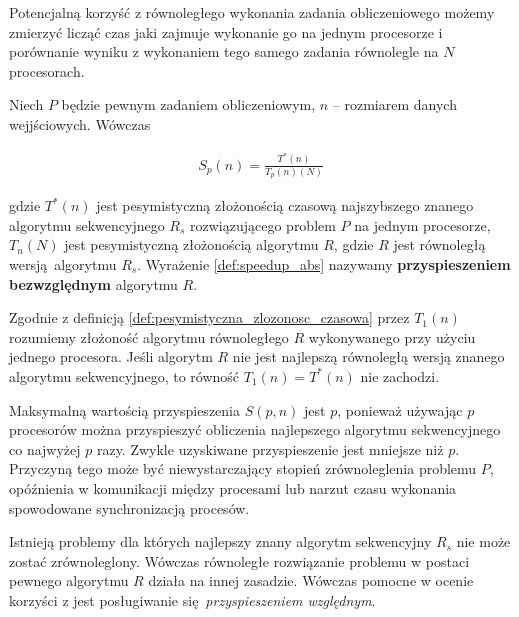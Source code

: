 Potencjalną korzyść z równoległego wykonania zadania obliczeniowego możemy zmierzyć licząć czas jaki zajmuje wykonanie go na jednym procesorze i porównanie wyniku z wykonaniem tego samego zadania równolegle na \(N\) procesorach. 

\begin{definicja}
Niech \(P\) będzie pewnym zadaniem obliczeniowym, \(n\) -- rozmiarem danych wejjściowych. Wówczas

\begin{align}\label{def:speedup_abs}
 S_{p}(n)=\frac{T^{*}(n)}{T_{p}(n)(N)}
\end{align}

gdzie \(T^{*}(n)\) jest pesymistyczną złożonością czasową najszybszego znanego algorytmu sekwencyjnego \(R_s\) rozwiązującego problem \(P\) na jednym procesorze, \(T_{n}(N)\) jest pesymistyczną złożonością algorytmu \(R\), gdzie \(R\) jest równoległą wersją algorytmu \(R_s\). Wyrażenie \ref{def:speedup_abs} nazywamy \textbf{przyspieszeniem bezwzględnym} algorytmu \(R\).
\end{definicja}

\begin{wniosek}
Zgodnie z definicją \ref{def:pesymistyczna_zlozonosc_czasowa} przez \(T_{1}(n)\) rozumiemy złożoność algorytmu równoległego \(R\) wykonywanego przy użyciu jednego procesora. Jeśli algorytm \(R\) nie jest najlepszą równoległą wersją znanego algorytmu sekwencyjnego, to równość \(T_{1}(n) = T^{*}(n)\) nie zachodzi.
\end{wniosek}

\begin{uwaga}
Maksymalną wartością przyspieszenia \(S(p,n)\) jest \(p\), ponieważ używając \(p\) procesorów można przyspieszyć obliczenia najlepszego algorytmu sekwencyjnego co najwyżej \(p\) razy. Zwykle uzyskiwane przyspieszenie jest mniejsze niż \(p\). Przyczyną tego może być niewystarczający stopień zrównoleglenia problemu \(P\), opóźnienia w komunikacji między procesami lub narzut czasu wykonania spowodowane synchronizacją procesów.
\end{uwaga}

\begin{uwaga}
Istnieją problemy dla których najlepszy znany algorytm sekwencyjny \(R_s\) nie może zostać zrównoleglony. Wówczas równoległe rozwiązanie problemu w postaci pewnego algorytmu \(R\) działa na innej zasadzie. Wówczas pomocne w ocenie korzyści z jest posługiwanie się \emph{przyspieszeniem względnym}.
\end{uwaga}

